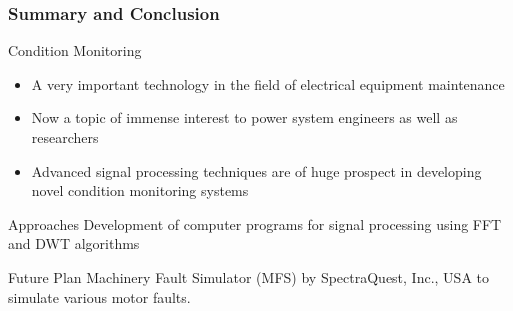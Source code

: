 \documentclass[9pt]{beamer}
\begin{document}
\begin{frame}
\frametitle{Summary and Conclusion}

\begin{block}{Condition Monitoring}
\begin{itemize}
\item A very important technology in the field of electrical equipment maintenance
\item Now a topic of immense interest to power system engineers as well as researchers

\item Advanced signal processing techniques are of huge prospect in developing novel condition monitoring systems
\end{itemize}
\end{block} 
\begin{block}{Approaches} Development of computer programs for signal processing using FFT and DWT algorithms \end{block}
\begin{block}{Future Plan}
\alert{Machinery Fault Simulator (MFS)} by SpectraQuest, Inc., USA to simulate various motor faults.
\end{block} 
\end{frame}
\end{document}

